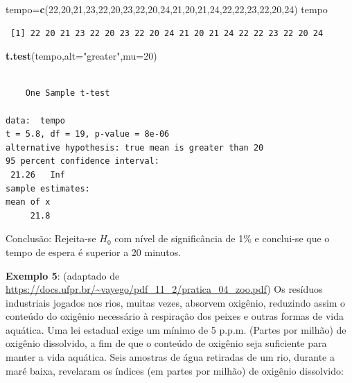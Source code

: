\documentclass[12pt,brazil,oneside]{book}
\newenvironment{Shaded}{\begin{snugshade}}{\end{snugshade}}
\newcommand{\DataTypeTok}[1]{\textcolor[rgb]{0.13,0.29,0.53}{#1}}
\newcommand{\DecValTok}[1]{\textcolor[rgb]{0.00,0.00,0.81}{#1}}
\newcommand{\KeywordTok}[1]{\textcolor[rgb]{0.13,0.29,0.53}{\textbf{#1}}}
\newcommand{\NormalTok}[1]{#1}
\newcommand{\StringTok}[1]{\textcolor[rgb]{0.31,0.60,0.02}{#1}}
\begin{document}
\begin{Shaded}
\begin{Highlighting}[]
\NormalTok{tempo=}\KeywordTok{c}\NormalTok{(}\DecValTok{22}\NormalTok{,}\DecValTok{20}\NormalTok{,}\DecValTok{21}\NormalTok{,}\DecValTok{23}\NormalTok{,}\DecValTok{22}\NormalTok{,}\DecValTok{20}\NormalTok{,}\DecValTok{23}\NormalTok{,}\DecValTok{22}\NormalTok{,}\DecValTok{20}\NormalTok{,}\DecValTok{24}\NormalTok{,}\DecValTok{21}\NormalTok{,}\DecValTok{20}\NormalTok{,}\DecValTok{21}\NormalTok{,}\DecValTok{24}\NormalTok{,}\DecValTok{22}\NormalTok{,}\DecValTok{22}\NormalTok{,}\DecValTok{23}\NormalTok{,}\DecValTok{22}\NormalTok{,}\DecValTok{20}\NormalTok{,}\DecValTok{24}\NormalTok{)}
\NormalTok{tempo}
\end{Highlighting}
\end{Shaded}

\begin{verbatim}
 [1] 22 20 21 23 22 20 23 22 20 24 21 20 21 24 22 22 23 22 20 24
\end{verbatim}

\begin{Shaded}
\begin{Highlighting}[]
\KeywordTok{t.test}\NormalTok{(tempo,}\DataTypeTok{alt=}\StringTok{"greater"}\NormalTok{,}\DataTypeTok{mu=}\DecValTok{20}\NormalTok{)}
\end{Highlighting}
\end{Shaded}

\begin{verbatim}

    One Sample t-test

data:  tempo
t = 5.8, df = 19, p-value = 8e-06
alternative hypothesis: true mean is greater than 20
95 percent confidence interval:
 21.26   Inf
sample estimates:
mean of x 
     21.8 
\end{verbatim}

Conclusão: Rejeita-se \(H_0\) com nível de significância de 1\% e conclui-se que o tempo de espera é superior a 20 minutos.

\textbf{Exemplo 5}: (adaptado de \url{https://docs.ufpr.br/~vayego/pdf_11_2/pratica_04_zoo.pdf}) Os resíduos industriais jogados nos rios, muitas vezes, absorvem oxigênio, reduzindo assim o conteúdo do oxigênio necessário à respiração dos peixes e outras formas de vida aquática. Uma lei estadual exige um mínimo de 5 p.p.m. (Partes por milhão) de oxigênio dissolvido, a fim de que o conteúdo de oxigênio seja suficiente para manter a vida aquática. Seis amostras de água retiradas de um rio, durante a maré baixa, revelaram os índices (em partes por milhão) de oxigênio dissolvido:
\end{document}
